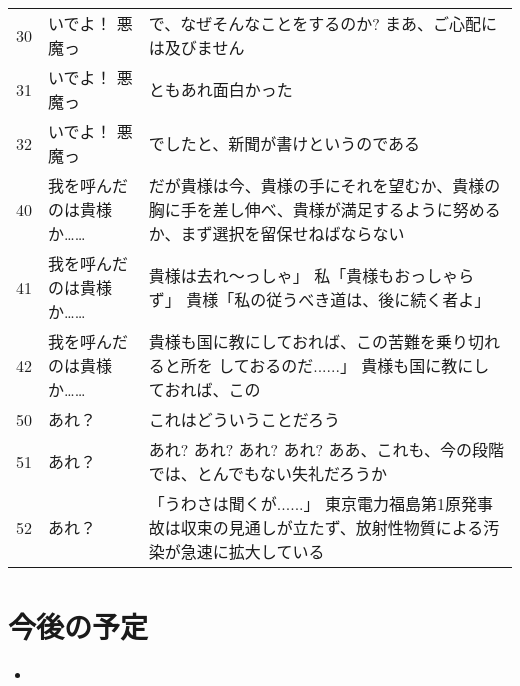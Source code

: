 \documentclass[onecolumn]{ujarticle}   %
\begin{document}
\begin{table}[tbh]
\begin{center}
\begin{tabular}{lp{5cm}p{7cm}}
30 &
  いでよ！ 悪魔っ &
  で、なぜそんなことをするのか? まあ、ご心配には及びません \\
31 &
  いでよ！ 悪魔っ &
  ともあれ面白かった \\
32 &
  いでよ！ 悪魔っ &
  でしたと、新聞が書けというのである \\


40 &
  我を呼んだのは貴様か…… &
  だが貴様は今、貴様の手にそれを望むか、貴様の胸に手を差し伸べ、貴様が満足するように努めるか、まず選択を留保せねばならない \\
41 &
  我を呼んだのは貴様か…… &
  貴様は去れ〜っしゃ」 私「貴様もおっしゃらず」 貴様「私の従うべき道は、後に続く者よ」 \\
42 &
  我を呼んだのは貴様か…… &
  貴様も国に教にしておれば、この苦難を乗り切れると所を しておるのだ......」 貴様も国に教にしておれば、この \\


50 &
  あれ？ &
  これはどういうことだろう \\
51 &
  あれ？ &
  あれ? あれ? あれ? あれ? ああ、これも、今の段階では、とんでもない失礼だろうか \\
52 &
  あれ？ &
  「うわさは聞くが......」   東京電力福島第1原発事故は収束の見通しが立たず、放射性物質による汚染が急速に拡大している \\



    \end{tabular}

    \label{tab:manga_news}
  \end{center}
\end{table}

\section{今後の予定}
\begin{itemize}
  \item
\end{itemize}



\end{document}
